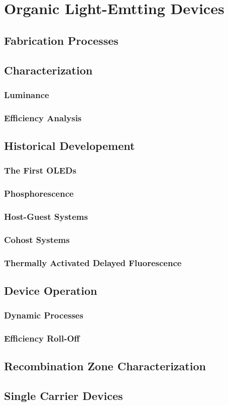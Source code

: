 \documentclass[../thesis.tex]{subfiles}
\begin{document}
\chapter{Organic Light-Emtting Devices}

\section{Fabrication Processes}

\section{Characterization}
\subsection{Luminance}
\subsection{Efficiency Analysis}

\section{Historical Developement}
\subsection{The First OLEDs}
\subsection{Phosphorescence}
\subsection{Host-Guest Systems}
\subsection{Cohost Systems}
\subsection{Thermally Activated Delayed Fluorescence}

\section{Device Operation}
\subsection{Dynamic Processes}
\subsection{Efficiency Roll-Off}

\section{Recombination Zone Characterization}

\section{Single Carrier Devices}



\end{document}
